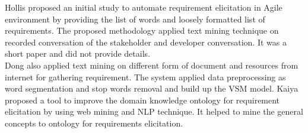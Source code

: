 Hollis \etal \cite{Hollis2017} proposed an initial study to automate requirement
elicitation in Agile environment by providing the list of words and loosely
formatted list of requirements. The proposed methodology applied text mining
technique on recorded conversation of the stakeholder and developer
conversation. It was a short paper and did not provide details.\\

Dong \etal \cite{dong2010} also applied text mining on different form of
document and resources from internet for gathering requirement. The system
applied data preprocessing as word segmentation and stop words removal and build
up the VSM model. Kaiya \etal \cite{Kaiya:2010} proposed a tool to improve the
domain knowledge ontology for requirement elicitation by using web mining and
NLP technique. It helped to mine the general concepts to ontology for
requirements elicitation.




 